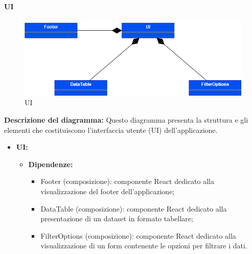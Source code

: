 \paragraph{UI}
\begin{figure}[h!] \centering
    \includegraphics[scale=0.45]{template/images/uml_front/ui/ui.png}
    \caption{UI}
\end{figure}
\textbf{Descrizione del diagramma:}
Questo diagramma presenta la struttura e gli elementi che costituiscono l'interfaccia utente (UI) dell'applicazione.
\begin{itemize}
    \item \textbf{UI:}
    \begin{itemize}
        \item \textbf{Dipendenze:}
        \begin{itemize}
            \item Footer (composizione): componente React dedicato alla visualizzazione del footer dell'applicazione;
            \item DataTable (composizione): componente React dedicato alla presentazione di un dataset in formato tabellare;
            \item FilterOptions (composizione): componente React dedicato alla visualizzazione di un form contenente le opzioni per filtrare i dati.
        \end{itemize} 
    \end{itemize}
\end{itemize}

\pagebreak

